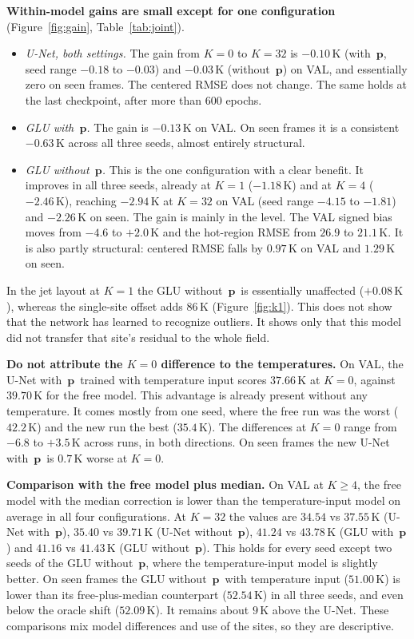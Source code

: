 \documentclass[11pt,letterpaper]{article}
\newcommand{\K}{\,\mathrm{K}}
\newcommand{\pon}{with~$\mathbf{p}$}
\newcommand{\poff}{without~$\mathbf{p}$}
\begin{document}
\textbf{Within-model gains are small except for one configuration} (Figure~\ref{fig:gain}, Table~\ref{tab:joint}).
\begin{itemize}
  \item \emph{U-Net, both settings.} The gain from $K{=}0$ to $K{=}32$ is $-0.10\K$ (\pon, seed range $-0.18$ to $-0.03$) and $-0.03\K$ (\poff) on VAL, and essentially zero on seen frames. The centered RMSE does not change. The same holds at the last checkpoint, after more than 600 epochs.
  \item \emph{GLU \pon.} The gain is $-0.13\K$ on VAL. On seen frames it is a consistent $-0.63\K$ across all three seeds, almost entirely structural.
  \item \emph{GLU \poff.} This is the one configuration with a clear benefit. It improves in all three seeds, already at $K{=}1$ ($-1.18\K$) and at $K{=}4$ ($-2.46\K$), reaching $-2.94\K$ at $K{=}32$ on VAL (seed range $-4.15$ to $-1.81$) and $-2.26\K$ on seen. The gain is mainly in the level. The VAL signed bias moves from $-4.6$ to $+2.0\K$ and the hot-region RMSE from $26.9$ to $21.1\K$. It is also partly structural: centered RMSE falls by $0.97\K$ on VAL and $1.29\K$ on seen.
\end{itemize}
In the jet layout at $K{=}1$ the GLU \poff\ is essentially unaffected ($+0.08\K$), whereas the single-site offset adds $86\K$ (Figure~\ref{fig:k1}). This does not show that the network has learned to recognize outliers. It shows only that this model did not transfer that site's residual to the whole field.

\textbf{Do not attribute the $K{=}0$ difference to the temperatures.} On VAL, the U-Net \pon\ trained with temperature input scores $37.66\K$ at $K{=}0$, against $39.70\K$ for the free model. This advantage is already present without any temperature. It comes mostly from one seed, where the free run was the worst ($42.2\K$) and the new run the best ($35.4\K$). The differences at $K{=}0$ range from $-6.8$ to $+3.5\K$ across runs, in both directions. On seen frames the new U-Net \pon\ is $0.7\K$ worse at $K{=}0$.

\textbf{Comparison with the free model plus median.} On VAL at $K\ge4$, the free model with the median correction is lower than the temperature-input model on average in all four configurations. At $K{=}32$ the values are $34.54$ vs $37.55\K$ (U-Net \pon), $35.40$ vs $39.71\K$ (U-Net \poff), $41.24$ vs $43.78\K$ (GLU \pon) and $41.16$ vs $41.43\K$ (GLU \poff). This holds for every seed except two seeds of the GLU \poff, where the temperature-input model is slightly better. On seen frames the GLU \poff\ with temperature input ($51.00\K$) is lower than its free-plus-median counterpart ($52.54\K$) in all three seeds, and even below the oracle shift ($52.09\K$). It remains about $9\K$ above the U-Net. These comparisons mix model differences and use of the sites, so they are descriptive.
\end{document}
